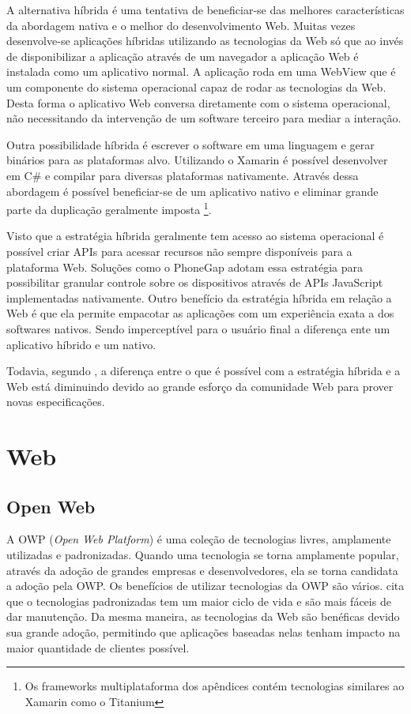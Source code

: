 A alternativa híbrida é uma tentativa de beneficiar-se das melhores
características da abordagem nativa e o melhor do desenvolvimento
Web. Muitas vezes desenvolve-se aplicações híbridas utilizando as
tecnologias da Web só que ao invés de disponibilizar a aplicação
através de um navegador a aplicação Web é instalada como um
aplicativo normal. A aplicação roda em uma WebView que é um
componente do sistema operacional capaz de rodar as tecnologias da
Web. Desta forma o aplicativo Web conversa diretamente com o sistema
operacional, não necessitando da intervenção de um software terceiro
para mediar a interação.

Outra possibilidade híbrida é escrever o software em uma linguagem
e gerar binários para as plataformas alvo. Utilizando o Xamarin é
possível desenvolver em C\# e compilar para diversas plataformas
nativamente. Através dessa abordagem é possível beneficiar-se de um
aplicativo nativo e eliminar grande parte da duplicação geralmente
imposta \footnote{Os frameworks multiplataforma dos apêndices contém
tecnologias similares ao Xamarin como o Titanium}.

Visto que a estratégia híbrida geralmente tem acesso ao sistema
operacional é possível criar APIs para acessar recursos não sempre
disponíveis para a plataforma Web. Soluções como o PhoneGap
adotam essa estratégia para possibilitar granular controle sobre os
dispositivos através de APIs JavaScript implementadas nativamente.
Outro benefício da estratégia híbrida em relação a Web é que
ela permite empacotar as aplicações com um experiência exata a
dos softwares nativos. Sendo imperceptível para o usuário final a
diferença ente um aplicativo híbrido e um nativo.

Todavia, segundo \citet[p. 8]{aSeriousContender}, a diferença entre o
que é possível com a estratégia híbrida e a Web está diminuindo
devido ao grande esforço da comunidade Web para prover novas
especificações.

\section{Web}

\subsection{Open Web}

A OWP (\textit{Open Web Platform}) é uma coleção de tecnologias
livres, amplamente utilizadas e padronizadas. Quando uma tecnologia
se torna amplamente popular, através da adoção de grandes empresas
e desenvolvedores, ela se torna candidata a adoção pela OWP. Os
benefícios de utilizar tecnologias da OWP são vários. \citet[p.
3]{svgTime} cita que o tecnologias padronizadas tem um maior ciclo de
vida e são mais fáceis de dar manutenção. Da mesma maneira, as tecnologias
da Web são benéficas devido sua grande adoção, permitindo que
aplicações baseadas nelas tenham impacto na maior quantidade de
clientes possível.

